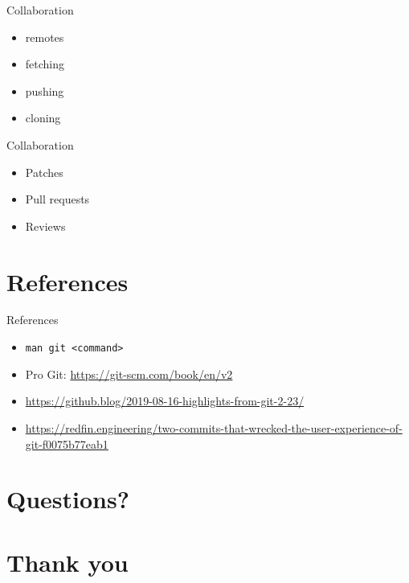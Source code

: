 \documentclass[presentation,aspectratio=169,smaller]{beamer}
\begin{document}
\begin{frame}[label={sec:orgcfd8e0e}]{Collaboration}
\begin{itemize}
\item remotes
\item fetching
\item pushing
\item cloning
\end{itemize}
\end{frame}

\begin{frame}[label={sec:orgc52aa56}]{Collaboration}
\begin{itemize}
\item Patches
\item Pull requests
\item Reviews
\end{itemize}
\end{frame}

\section*{References}
\label{sec:org9c915f7}
\begin{frame}[label={sec:org250b40f},fragile]{References}
 \begin{itemize}
\item \texttt{man git <command>}
\item Pro Git: \url{https://git-scm.com/book/en/v2}
\item \url{https://github.blog/2019-08-16-highlights-from-git-2-23/}
\item \url{https://redfin.engineering/two-commits-that-wrecked-the-user-experience-of-git-f0075b77eab1}
\end{itemize}
\end{frame}

\section{Questions?}
\label{sec:org8d3a751}
\section{Thank you}
\label{sec:org8616cca}
\end{document}
